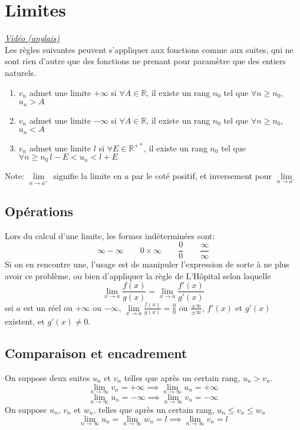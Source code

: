 \documentclass{article}
\begin{document}
\section{Limites}
\href{https://youtu.be/kfF40MiS7zA}{\underline{\textit{Vidéo (anglais)}}}\\
\break
Les règles suivantes peuvent s'appliquer aux fonctions comme aux suites, qui ne sont rien d'autre que des fonctions ne prenant pour paramètre que des entiers naturels.
\begin{enumerate}
	\item $v_n$ admet une limite $+\infty$ si $\forall A \in \mathbb{R}$, il existe un rang $n_0$ tel que $\forall n \ge n_0$, $u_n > A$
	\item $v_n$ admet une limite $-\infty$ si $\forall A \in \mathbb{R}$, il existe un rang $n_0$ tel que $\forall n \ge n_0$, $u_n < A$
	\item $v_n$ admet une limite $l$ si $\forall E \in \mathbb{R^{+*}}$, il existe un rang $n_0$ tel que $\forall n \ge n_0\,l-E<u_n<l+E$
\end{enumerate}
Note: $\lim \limits_{n \rightarrow a^+}$ signifie la limite en $a$ par le coté positif, et inversement pour $\lim \limits_{n \rightarrow a^-}$

\subsection{Opérations}
Lors du calcul d'une limite, les formes indéterminées sont:
\\$$\infty - \infty \qquad 0 \times \infty \qquad \frac{0}{0} \qquad \frac{\infty}{\infty}$$
Si on en rencontre une, l'usage est de manipuler l'expression de sorte à ne plus avoir ce problème, ou bien d'appliquer la règle de L'Hôpital selon laquelle $$\lim \limits_{x \rightarrow a} \frac{f(x)}{g(x)} = \lim \limits_{x \rightarrow a} \frac{f'(x)}{g'(x)}$$ ssi $a$ est un réel ou $+\infty$ ou $-\infty$, $\lim \limits_{x \rightarrow a} \frac{f(x)}{g(x)} = \frac{0}{0}$ ou $\frac{\pm\infty}{\pm\infty}$, $f'(x)$ et $g'(x)$ existent, et $g'(x) \ne 0$.

\subsection{Comparaison et encadrement}
On suppose deux suites $u_n$ et $v_n$ telles que après un certain rang, $u_n>v_n$.
$$\lim \limits_{n \rightarrow \infty} v_n = + \infty \implies \lim \limits_{n \rightarrow \infty} u_n = + \infty$$
$$\lim \limits_{n \rightarrow \infty} u_n = - \infty \implies \lim \limits_{n \rightarrow \infty} v_n = - \infty$$
On suppose $u_n$, $v_n$ et $w_n$, telles que après un certain rang, $u_n \le v_n \le w_n$
$$\lim \limits_{n \rightarrow \infty} u_n = \lim \limits_{n \rightarrow \infty} w_n = l \implies \lim \limits_{n \rightarrow \infty} v_n = l$$
\end{document}
